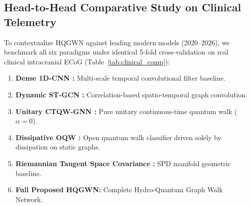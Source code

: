 \documentclass[journal,twocolumn,10pt]{IEEEtran}
\begin{document}
\subsection{Head-to-Head Comparative Study on Clinical Telemetry}
To contextualize HQGWN against leading modern models (2020--2026), we benchmark all six paradigms under identical 5-fold cross-validation on real clinical intracranial ECoG (Table~\ref{tab:clinical_comp}):
\begin{enumerate}
    \item \textbf{Dense 1D-CNN \cite{schirrmeister2017deep}:} Multi-scale temporal convolutional filter baseline.
    \item \textbf{Dynamic ST-GCN \cite{hajisafi2024dynamic}:} Correlation-based spatio-temporal graph convolution.
    \item \textbf{Unitary CTQW-GNN \cite{zhan2026continuous}:} Pure unitary continuous-time quantum walk ($\alpha=0$).
    \item \textbf{Dissipative OQW \cite{linck2026dissipative}:} Open quantum walk classifier driven solely by dissipation on static graphs.
    \item \textbf{Riemannian Tangent Space Covariance \cite{barachant2012multiclass}:} SPD manifold geometric baseline.
    \item \textbf{Full Proposed HQGWN:} Complete Hydro-Quantum Graph Walk Network.
\end{enumerate}
\end{document}
